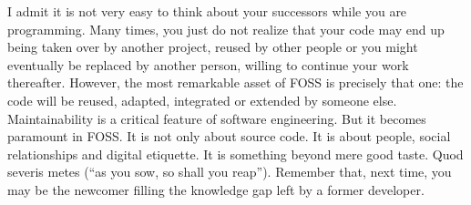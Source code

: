 I admit it is not very easy to think about your successors while you are
programming. Many times, you just do not realize that your code may end up being
taken over by another project, reused by other people or you might eventually be
replaced by another person, willing to continue your work thereafter.
However, the most remarkable asset of FOSS is precisely that one: the code will
be reused, adapted, integrated or extended by someone else. Maintainability is a
critical feature of software engineering. But it becomes paramount in FOSS. It
is not only about source code. It is about people, social relationships and
digital etiquette. It is something beyond mere good taste. Quod severis metes
(``as you sow, so shall you reap''). Remember that, next time, you may be the
newcomer filling the knowledge gap left by a former developer.
